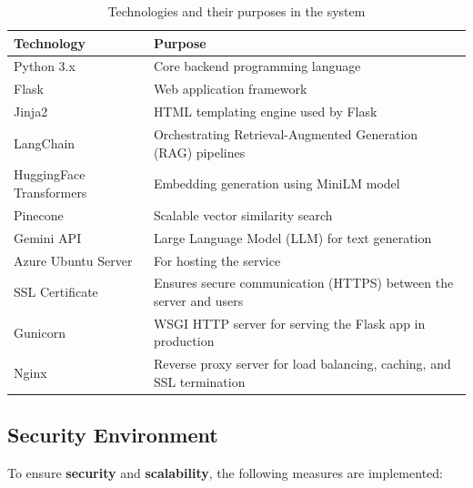 \documentclass[12pt,a4paper]{report}
\begin{document}
\begin{table}[H]
\centering
\begin{tabular}{|l|p{10cm}|}
\hline
\textbf{Technology} & \textbf{Purpose} \\
\hline
Python 3.x & Core backend programming language \\
\hline
Flask & Web application framework \\
\hline
Jinja2 & HTML templating engine used by Flask \\
\hline
LangChain & Orchestrating Retrieval-Augmented Generation (RAG) pipelines \\
\hline
HuggingFace Transformers & Embedding generation using MiniLM model \\
\hline
Pinecone & Scalable vector similarity search \\
\hline
Gemini API & Large Language Model (LLM) for text generation \\
\hline
Azure Ubuntu Server & For hosting the service \\
\hline
SSL Certificate & Ensures secure communication (HTTPS) between the server and users \\
\hline
Gunicorn & WSGI HTTP server for serving the Flask app in production \\
\hline
Nginx & Reverse proxy server for load balancing, caching, and SSL termination \\
\hline
\end{tabular}
\caption{Technologies and their purposes in the system}
\label{tab:technology_purpose}
\end{table}



\label{Security and Environment}
\subsection{Security  Environment}

To ensure \textbf{security} and \textbf{scalability}, the following measures are implemented:
\end{document}
